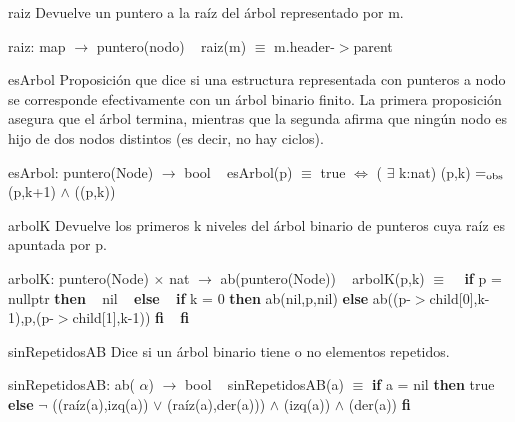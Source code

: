 \begin{DoxyParagraph}{raiz}
Devuelve un puntero a la raíz del árbol representado por m.

raiz\+: map $\to$ puntero(nodo) ~\newline
raiz(m) $\equiv$ m.\+header-\/$>$parent


\end{DoxyParagraph}
\begin{DoxyParagraph}{es\+Arbol}
Proposición que dice si una estructura representada con punteros a nodo se corresponde efectivamente con un árbol binario finito. La primera proposición asegura que el árbol termina, mientras que la segunda afirma que ningún nodo es hijo de dos nodos distintos (es decir, no hay ciclos).

es\+Arbol\+: puntero(\+Node) $\to$ bool ~\newline
es\+Arbol(p) $\equiv$ true $\Leftrightarrow$ ( $\exists$ k\+:nat) (p,k) $=_{\rm obs}$ (p,k+1) $\land$ ((p,k))


\end{DoxyParagraph}
\begin{DoxyParagraph}{arbolK}
Devuelve los primeros k niveles del árbol binario de punteros cuya raíz es apuntada por p.

arbolK\+: puntero(\+Node) $\times$ nat $\to$ ab(puntero(\+Node)) ~\newline
arbol\+K(p,k) $\equiv$ ~\newline
 {\bfseries if} p = nullptr {\bfseries then} ~\newline
 nil ~\newline
 {\bfseries else} ~\newline
{\bfseries if} k = 0 {\bfseries then} ab(nil,p,nil) {\bfseries else} ab((p-\/$>$child\mbox{[}0\mbox{]},k-\/1),p,(p-\/$>$child\mbox{[}1\mbox{]},k-\/1)) {\bfseries fi} ~\newline
 {\bfseries fi} 


\end{DoxyParagraph}
\begin{DoxyParagraph}{sin\+Repetidos\+AB}
Dice si un árbol binario tiene o no elementos repetidos.

sin\+Repetidos\+AB\+: ab( $\alpha$) $\to$ bool ~\newline
sin\+Repetidos\+A\+B(a) $\equiv$ {\bfseries if} a = nil {\bfseries then} true {\bfseries else} $\lnot$ ((raíz(a),izq(a)) $\lor$ (raíz(a),der(a))) $\land$ (izq(a)) $\land$ (der(a)) {\bfseries fi} 


\end{DoxyParagraph}
